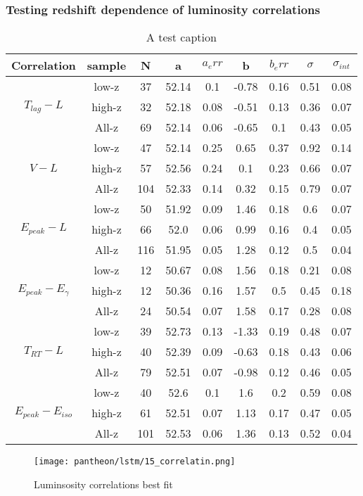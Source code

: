\subsubsection{Testing redshift dependence of luminosity correlations}
\begin{table}[H]
\centering
\begin{tabular}{|c|c|c|c|c|c|c|c|c|}
\hline
Correlation & sample & N & a & $a_err$ & b & $b_err$ & $\sigma$ & $\sigma_{int}$\\
\hline
\multirow{3}{*}{$T_{lag}-L$} & low-z & 37 & 52.14 & 0.1 & -0.78 & 0.16 & 0.51 & 0.08\\
\cline{2-9}
 & high-z & 32 & 52.18 & 0.08 & -0.51 & 0.13 & 0.36 & 0.07\\
\cline{2-9}
 & All-z & 69 & 52.14 & 0.06 & -0.65 & 0.1 & 0.43 & 0.05\\
\hline
\multirow{3}{*}{$V-L$} & low-z & 47 & 52.14 & 0.25 & 0.65 & 0.37 & 0.92 & 0.14\\
\cline{2-9}
 & high-z & 57 & 52.56 & 0.24 & 0.1 & 0.23 & 0.66 & 0.07\\
\cline{2-9}
 & All-z & 104 & 52.33 & 0.14 & 0.32 & 0.15 & 0.79 & 0.07\\
\hline
\multirow{3}{*}{$E_{peak}-L$} & low-z & 50 & 51.92 & 0.09 & 1.46 & 0.18 & 0.6 & 0.07\\
\cline{2-9}
 & high-z & 66 & 52.0 & 0.06 & 0.99 & 0.16 & 0.4 & 0.05\\
\cline{2-9}
 & All-z & 116 & 51.95 & 0.05 & 1.28 & 0.12 & 0.5 & 0.04\\
\hline
\multirow{3}{*}{$E_{peak}-E_{\gamma}$} & low-z & 12 & 50.67 & 0.08 & 1.56 & 0.18 & 0.21 & 0.08\\
\cline{2-9}
 & high-z & 12 & 50.36 & 0.16 & 1.57 & 0.5 & 0.45 & 0.18\\
\cline{2-9}
 & All-z & 24 & 50.54 & 0.07 & 1.58 & 0.17 & 0.28 & 0.08\\
\hline
\multirow{3}{*}{$T_{RT}-L$} & low-z & 39 & 52.73 & 0.13 & -1.33 & 0.19 & 0.48 & 0.07\\
\cline{2-9}
 & high-z & 40 & 52.39 & 0.09 & -0.63 & 0.18 & 0.43 & 0.06\\
\cline{2-9}
 & All-z & 79 & 52.51 & 0.07 & -0.98 & 0.12 & 0.46 & 0.05\\
\hline
\multirow{3}{*}{$E_{peak}-E_{iso}$} & low-z & 40 & 52.6 & 0.1 & 1.6 & 0.2 & 0.59 & 0.08\\
\cline{2-9}
 & high-z & 61 & 52.51 & 0.07 & 1.13 & 0.17 & 0.47 & 0.05\\
\cline{2-9}
 & All-z & 101 & 52.53 & 0.06 & 1.36 & 0.13 & 0.52 & 0.04\\
\hline
\end{tabular}
\caption{A test caption}
\label{table_union_lstm}
\end{table}
\begin{figure}[H]
	\centering
	\texttt{[image: pantheon/lstm/15\_correlatin.png]}
	\caption{Luminsosity correlations best fit}
	\label{fig:correlation_lstm_union}
\end{figure}
